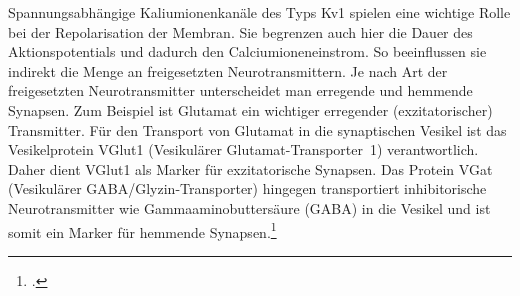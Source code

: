 Spannungsabhängige Kaliumionenkanäle des Typs Kv1 spielen eine wichtige
Rolle bei der Repolarisation der Membran. Sie begrenzen auch hier die
Dauer des Aktionspotentials und dadurch den Calciumioneneinstrom. So
beeinflussen sie indirekt die Menge an freigesetzten Neurotransmittern.
Je nach Art der freigesetzten Neurotransmitter unterscheidet man
erregende und hemmende Synapsen. Zum Beispiel ist Glutamat ein wichtiger
erregender (exzitatorischer) Transmitter. Für den Transport von Glutamat
in die synaptischen Vesikel ist das Vesikelprotein VGlut1 (Vesikulärer
Glutamat-Transporter~1) verantwortlich. Daher dient VGlut1 als Marker
für exzitatorische Synapsen. Das Protein VGat (Vesikulärer
GABA/Glyzin-Transporter) hingegen transportiert inhibitorische
Neurotransmitter wie Gammaaminobuttersäure (GABA) in die Vesikel und ist
somit ein Marker für hemmende
Synapsen.\footcite[S.~1092]{Markl1997}

